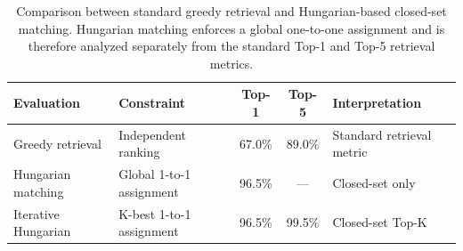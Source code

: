 \begin{table}[htbp]
\centering
\caption{Comparison between standard greedy retrieval and Hungarian-based closed-set matching. Hungarian matching enforces a global one-to-one assignment and is therefore analyzed separately from the standard Top-1 and Top-5 retrieval metrics.}
\label{tab:greedy_vs_hungarian}
\begin{tabular}{llccp{4cm}}
\toprule
\textbf{Evaluation} & \textbf{Constraint} & \textbf{Top-1} & \textbf{Top-5} & \textbf{Interpretation} \\
\midrule
Greedy retrieval & Independent ranking & 67.0\% & 89.0\% & Standard retrieval metric \\
Hungarian matching & Global 1-to-1 assignment & 96.5\% & --- & Closed-set only \\
Iterative Hungarian & K-best 1-to-1 assignment & 96.5\% & 99.5\% & Closed-set Top-K \\
\bottomrule
\end{tabular}
\end{table}

